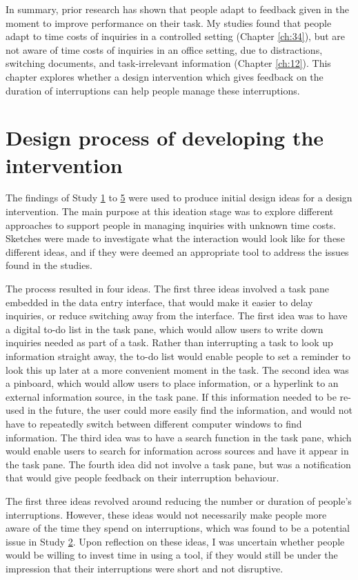 In summary, prior research has shown that people adapt to feedback given in the moment to improve performance on their task. My studies found that people adapt to time costs of inquiries in a controlled setting (Chapter \ref{ch:34}), but are not aware of time costs of inquiries in an office setting, due to distractions, switching documents, and task-irrelevant information (Chapter \ref{ch:12}). This chapter explores whether a design intervention which gives feedback on the duration of interruptions can help people manage these interruptions.

\section{Design process of developing the intervention}
The findings of Study \hyperref[st:Study1]{1} to \hyperref[st:Study5]{5} were used to produce initial design ideas for a design intervention. The main purpose at this ideation stage was to explore different approaches to support people in managing inquiries with unknown time costs. Sketches were made to investigate what the interaction would look like for these different ideas, and if they were deemed an appropriate tool to address the issues found in the studies. 

The process resulted in four ideas. The first three ideas involved a task pane embedded in the data entry interface, that would make it easier to delay inquiries, or reduce switching away from the interface. The first idea was to have a digital to-do list in the task pane, which would allow users to write down inquiries needed as part of a task. Rather than interrupting a task to look up information straight away, the to-do list would enable people to set a reminder to look this up later at a more convenient moment in the task. The second idea was a pinboard, which would allow users to place information, or a hyperlink to an external information source, in the task pane. If this information needed to be re-used in the future, the user could more easily find the information, and would not have to repeatedly switch between different computer windows to find information. The third idea was to have a search function in the task pane, which would enable users to search for information across sources and have it appear in the task pane. The fourth idea did not involve a task pane, but was a notification that would give people feedback on their interruption behaviour.

The first three ideas revolved around reducing the number or duration of people’s interruptions. However, these ideas would not necessarily make people more aware of the time they spend on interruptions, which was found to be a potential issue in Study \hyperref[st:Study2]{2}. Upon reflection on these ideas, I was uncertain whether people would be willing to invest time in using a tool, if they would still be under the impression that their interruptions were short and not disruptive. 

